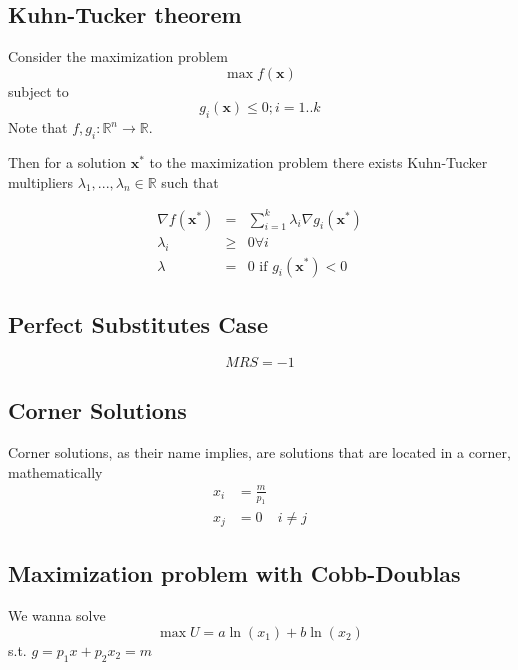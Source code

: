 \documentclass[a4paper] {scrartcl}
\begin{document}
\subsection{Kuhn-Tucker theorem}
Consider the maximization problem
\begin{equation}
	\max f( \mathbf{x})
\end{equation}
subject to
\begin{equation}
	g_i( \mathbf{x})\leq 0; i=1.. k
\end{equation}
Note that $f, g_i: \mathbb R^n\rightarrow \mathbb R$.

Then for a solution $\mathbf{x^*}$ to the maximization problem there exists Kuhn-Tucker multipliers $\lambda_1,...,\lambda_n\in\mathbb R$ such that

\begin{eqnarray}
	\nabla f( \mathbf{x^*})&=& \sum_{i=1}^k \lambda_i\nabla g_i( \mathbf{x^*})\\
	\lambda_i&\geq&0 \forall i\\
	\lambda &=& 0 \text{ if } g_i( \mathbf{x^*})<0
\end{eqnarray}

\subsection{Perfect Substitutes Case}
\begin{equation}
	MRS = -1
\end{equation}
\subsection{Corner Solutions}
Corner solutions, as their name implies, are solutions that are located in a corner, mathematically
\begin{eqnarray}
	x_i&= \frac{m}{p_1}
	\\
	x_j &= 0 &i\neq j
\end{eqnarray}

\subsection{Maximization problem with Cobb-Doublas}

We wanna solve
\begin{equation}
	\max U = a\ln{(x_1)} + b\ln{(x_2)}
\end{equation}
s.t. $g=p_1x+p_2x_2=m$
\end{document}
